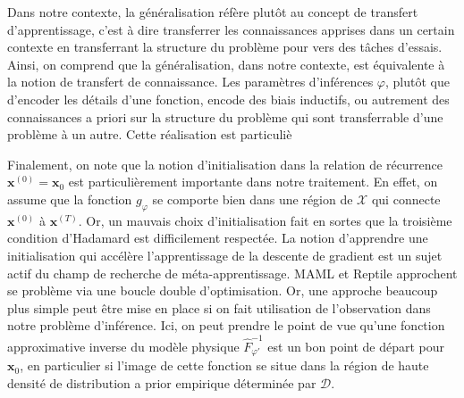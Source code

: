 Dans notre contexte, la généralisation réfère plutôt au concept de transfert d'apprentissage, c'est à dire transferrer les connaissances 
apprises dans un certain contexte en transferrant la structure du problème pour vers des tâches d'essais. Ainsi, on comprend que la généralisation, 
dans notre contexte, est équivalente à la notion de transfert de connaissance. Les paramètres d'inférences $\varphi$, plutôt que d'encoder les détails 
d'une fonction, encode des biais inductifs, ou autrement des connaissances a priori sur la structure du problème qui sont transferrable d'une problème 
à un autre. Cette réalisation est particuliè

Finalement, on note que la notion d'initialisation dans la relation de récurrence $\mathbf{x}^{(0)} = \mathbf{x}_0$ est particulièrement 
importante dans notre traitement. En effet, on assume que la fonction $g_\varphi$ se comporte bien dans une région 
de $\mathcal{X}$ qui connecte $\mathbf{x}^{(0)}$ à $\mathbf{x}^{(T)}$. Or, un mauvais choix d'initialisation fait en sortes que 
la troisième condition d'Hadamard est difficilement respectée. La notion d'apprendre une initialisation 
qui accélère l'apprentissage de la descente de gradient est un sujet actif du champ de recherche de méta-apprentissage. 
MAML et Reptile approchent se problème via une boucle double d'optimisation. Or, une approche beaucoup plus simple 
peut être mise en place si on fait utilisation de l'observation dans notre problème d'inférence. Ici, on peut prendre le point 
de vue qu'une fonction approximative inverse du modèle physique $\hat{F}_{\varphi'}^{-1}$ est un bon point de départ pour $\mathbf{x}_0$, 
en particulier si l'image de cette fonction se situe dans la région de haute densité de distribution a prior empirique 
déterminée par $\mathcal{D}$.


